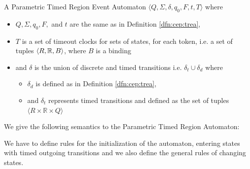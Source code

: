 				
				\begin{dfn}
					\label{dfn:cep:ptrea}
					A Parametric Timed Region Event Automaton $\langle Q,\Sigma,\delta,q_0, F, t, T \rangle$ where
					\begin{itemize}
						\item $Q, \Sigma, q_0, F,$ and  $t$ are the same as in Definition \ref{dfn:cep:trea},
						\item $T$ is a set of timeout clocks for sets of states, for each token, i.e. a set of tuples $\langle R, \mathbb{R}, B \rangle$, where $B$ is a binding
						\item and $\delta$ is the union of discrete and timed transitions i.e. $\delta_t \cup \delta_d$ where
						\begin{itemize}
							\item $\delta_d$ is defined as in Definition \ref{dfn:cep:trea},
							\item and $\delta_t$ represents timed transitions and defined as the set of tuples $\langle R \times \mathbb{R} \times Q \rangle$ 
						\end{itemize}
					\end{itemize}
				\end{dfn}
				
				We give the following semantics to the Parametric Timed Region Automaton:
				
				We have to define rules for the initialization of the automaton,
				entering states with timed outgoing transitions 
				and we also define the general rules of changing states. 
				
